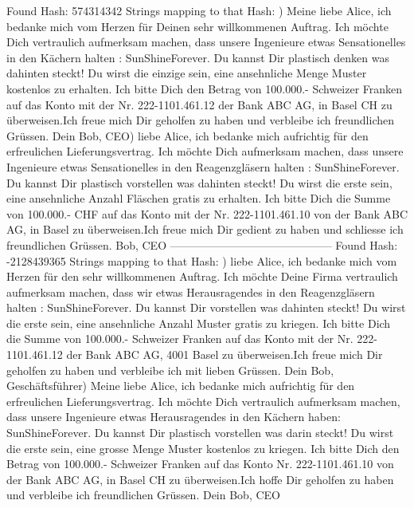 \documentclass[10pt]{scrartcl}
\begin{document}
Found Hash: 574314342\newline
Strings mapping to that Hash: ) Meine liebe Alice, ich bedanke mich vom Herzen für Deinen sehr willkommenen Auftrag. Ich möchte Dich vertraulich aufmerksam machen, dass unsere Ingenieure etwas Sensationelles in den Kächern  halten : SunShineForever. Du kannst Dir plastisch denken was dahinten steckt! Du wirst die einzige sein, eine ansehnliche Menge Muster kostenlos zu erhalten. Ich bitte Dich den Betrag von 100.000.- Schweizer Franken auf das Konto mit der Nr. 222-1101.461.12 der  Bank ABC AG, in Basel CH zu überweisen.Ich freue mich Dir geholfen zu haben und verbleibe ich freundlichen Grüssen. Dein Bob, CEO) liebe Alice, ich bedanke mich aufrichtig für den erfreulichen Lieferungsvertrag. Ich möchte Dich aufmerksam machen, dass unsere Ingenieure etwas Sensationelles in den Reagenzgläsern  halten : SunShineForever. Du kannst Dir plastisch vorstellen was dahinten steckt! Du wirst die erste  sein, eine ansehnliche Anzahl Fläschen gratis zu erhalten. Ich bitte Dich die Summe von 100.000.- CHF auf das Konto mit der Nr. 222-1101.461.10 von der Bank ABC AG, in Basel zu überweisen.Ich freue mich Dir gedient zu haben und schliesse ich freundlichen Grüssen. Bob, CEO\newline
--------------------------------------------\newline
Found Hash: -2128439365\newline
Strings mapping to that Hash: ) liebe Alice, ich bedanke mich vom Herzen für den sehr willkommenen Auftrag. Ich möchte Deine Firma vertraulich aufmerksam machen, dass wir etwas Herausragendes in den Reagenzgläsern  halten : SunShineForever. Du kannst Dir  vorstellen was dahinten steckt! Du wirst die erste  sein, eine ansehnliche Anzahl Muster gratis zu kriegen. Ich bitte Dich die Summe von 100.000.- Schweizer Franken auf das Konto mit der Nr. 222-1101.461.12 der  Bank ABC AG, 4001 Basel zu überweisen.Ich freue mich Dir geholfen zu haben und verbleibe ich mit lieben Grüssen. Dein Bob, Geschäftsführer) Meine liebe Alice, ich bedanke mich aufrichtig für den erfreulichen Lieferungsvertrag. Ich möchte Dich vertraulich aufmerksam machen, dass unsere Ingenieure etwas Herausragendes in den Kächern haben: SunShineForever. Du kannst Dir plastisch vorstellen was darin steckt! Du wirst die erste  sein, eine grosse Menge Muster kostenlos zu kriegen. Ich bitte Dich den Betrag von 100.000.- Schweizer Franken auf das Konto Nr. 222-1101.461.10 von der Bank ABC AG, in Basel CH zu überweisen.Ich hoffe Dir geholfen zu haben und verbleibe ich freundlichen Grüssen. Dein Bob, CEO\newline
\end{document}

